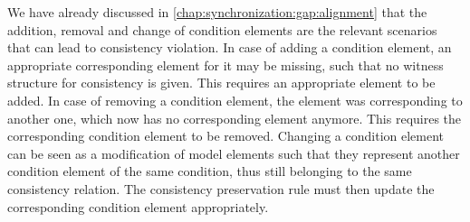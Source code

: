 


We have already discussed in \autoref{chap:synchronization:gap:alignment} that the addition, removal and change of condition elements are the relevant scenarios that can lead to consistency violation.
In case of adding a condition element, an appropriate corresponding element for it may be missing, such that no witness structure for consistency is given.
This requires an appropriate element to be added.
In case of removing a condition element, the element was corresponding to another one, which now has no corresponding element anymore.
This requires the corresponding condition element to be removed.
Changing a condition element can be seen as a modification of model elements such that they represent another condition element of the same condition, thus still belonging to the same consistency relation.
The consistency preservation rule must then update the corresponding condition element appropriately.

